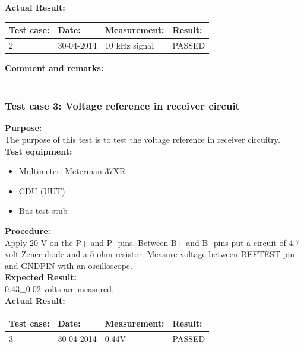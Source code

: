 \textbf{Actual Result:}\\
\begin{table}[H]
\centering
\begin{tabular}{|p{2cm}|p{2cm}|p{3cm}|p{2cm}|}\hline
\textbf{Test case:} & \textbf{Date:} & \textbf{Measurement:} & \textbf{Result:} \\ \hline
2 & 30-04-2014 & 10 kHz signal & PASSED \\ \hline
\end{tabular}
\end{table}

\textbf{Comment and remarks:}\\
-\\

\subsubsection{Test case 3: Voltage reference in receiver circuit}
\textbf{Purpose:}\\
The purpose of this test is to test the voltage reference in receiver circuitry.\\

\textbf{Test equipment:}
\begin{itemize}
\item Multimeter: Meterman 37XR
\item CDU (UUT)
\item Bus test stub
\end{itemize}

\textbf{Procedure:}\\
Apply 20 V on the P+ and P- pins. Between B+ and B- pins put a circuit of 4.7 volt Zener diode and a 5 ohm resistor. Measure voltage between REFTEST pin and GNDPIN with an oscilloscope.\\

\textbf{Expected Result:}\\
0.43$\pm$0.02 volts are measured.\\

\textbf{Actual Result:}\\
\begin{table}[H]
\centering
\begin{tabular}{|p{2cm}|p{2cm}|p{3cm}|p{2cm}|}\hline
\textbf{Test case:} & \textbf{Date:} & \textbf{Measurement:} & \textbf{Result:} \\ \hline
3 & 30-04-2014 & 0.44V & PASSED \\ \hline
\end{tabular}
\end{table}

